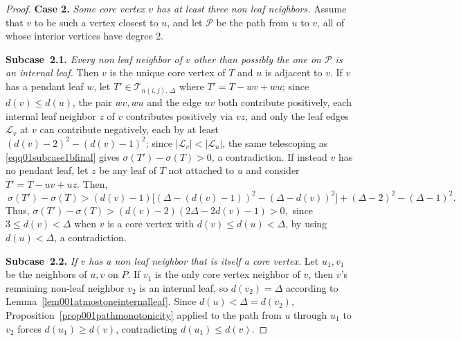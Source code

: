 \documentclass[10pt,a4paper]{amsart}
\newcommand{\TT}{\mathcal{T}}
\begin{document}
\begin{proof}
\medskip

\noindent \textbf{Case 2.} \textit{Some core vertex $v$ has at least three non leaf neighbors.} Assume that $v$ to be such a vertex closest to $u$, and let $\mathcal P$ be the path from $u$ to $v$, all of whose interior vertices have degree $2$.

\smallskip

\textbf{Subcase~2.1.} \emph{Every non leaf neighbor of $v$ other than possibly the one
on $\mathcal P$ is an internal leaf.}  Then $v$ is the unique core vertex of $T$ and $u$
is adjacent to $v$. If $v$ has a pendant leaf $w$, let $T'\in \TT_{n(i,j),\,\Delta}$ where $T'=T-wv+wu$; since
$d(v)\leqslant d(u)$, the pair $wv,wu$ and the edge $uv$ both contribute positively,
each internal leaf neighbor $z$ of $v$   contributes positively via $vz$,
and only the leaf edges $\mathcal L_v$ at $v$  can contribute
negatively, each by at least $(d(v)-2)^2-(d(v)-1)^2$; since
$|\mathcal L_v|<|\mathcal L_u|$, the same telescoping as
\eqref{eqq01subcase1bfinal} gives $\sigma(T')-\sigma(T)>0$, a contradiction.
If instead $v$ has no pendant leaf, let $z$ be any leaf of $T$ not attached to
$u$ and consider $T'=T-uv+uz$. Then, 
\begin{equation}~\label{eqq01subcase2anoleaf}
\sigma(T')-\sigma(T) >
(d(v)-1)\Big[(\Delta\!-\!(d(v)\!-\!1))^2\!-\!(\Delta\!-\!d(v))^2\Big]
\!+\!(\Delta\!-\!2)^2\!-\!(\Delta\!-\!1)^2.
\end{equation}
Thus, $\sigma(T')-\sigma(T) >(d(v)-2)(2\Delta-2d(v)-1) > 0,$
since $3\leqslant d(v)<\Delta$ when $v$ is a core vertex with $d(v)\leqslant d(u)<\Delta$,
 by using $d(u)<\Delta$, a contradiction.

\smallskip

\textbf{Subcase~2.2.} \emph{If $v$ has a non leaf neighbor that is itself a core vertex.} 
Let $u_1,v_1$ be the neighbors of $u,v$ on $P$. If $v_1$ is the only
core vertex neighbor of $v$, then $v$'s remaining non-leaf neighbor $v_2$ is
an internal leaf, so $d(v_2)=\Delta$ according to
Lemma~\ref{lem001atmostoneinternalleaf}. Since $d(u)<\Delta=d(v_2)$,
Proposition~\ref{prop001pathmonotonicity} applied to the path from $u$ through
$u_1$ to $v_2$   forces $d(u_1)\geqslant d(v)$, contradicting
$d(u_1)\leqslant d(v)$.


\end{proof}
\end{document}
